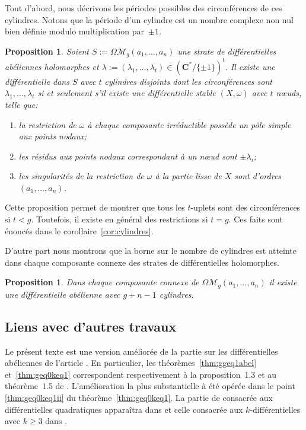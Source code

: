 \documentclass[11pt]{article}
\numberwithin{equation}{section}\renewcommand{\proofname}{Démonstration}
\let\mathcal\mathscr
\newcommand{\CC}{\mathbf{C}}
\newcommand{\omoduli}[1][g]{{\Omega\mathcal M}_{\!#1}}
\newtheorem{prop}[thm]{Proposition}
\theoremstyle{definition}
\begin{document}
Tout d'abord, nous décrivons les périodes possibles des circonférences de ces cylindres. Notons que la période d'un cylindre est un nombre complexe non nul bien définie modulo multiplication par~$\pm 1$.
\begin{prop}\label{prop:cylindres}
Soient $S:=\omoduli(a_{1},\dots,a_{n})$ une strate de différentielles abéliennes holomorphes et $\lambda:=(\lambda_{1},\dots,\lambda_{t})\in (\CC^{\ast}/\{\pm1\})^{t}$.
Il existe une différentielle dans $S$ avec $t$ cylindres disjoints dont les circonférences sont $\lambda_{1},\dots,\lambda_{t}$ si et seulement s'il existe une
différentielle stable $(X,\omega)$ avec $t$ nœuds, telle que:
\begin{enumerate}
\item la restriction de $\omega$ à chaque composante irréductible possède un pôle simple aux points nodaux;
\item les résidus aux points nodaux correspondant à un nœud sont $\pm \lambda_{i}$;
\item les singularités de la restriction de $\omega$ à la partie lisse de $X$ sont d'ordres $(a_{1},\dots,a_{n})$.
\end{enumerate}
\end{prop}
Cette proposition permet de montrer que tous les $t$-uplets sont des circonférences si $t<g$. Toutefois, il existe en général des restrictions si $t=g$. Ces faits sont énoncés dans le corollaire~\ref{cor:cylindres}.

D'autre part nous montrons que la borne sur le nombre de cylindres est atteinte dans chaque composante connexe des strates de différentielles holomorphes.
\begin{prop}\label{prop:cylcc}
Dans chaque composante connexe de $\omoduli(a_{1},\dots,a_{n})$ il existe une différentielle abélienne avec $g+n-1$ cylindres.
\end{prop}

\subsection{Liens avec d'autres travaux}
\label{sec:travauxintro}

Le présent texte est une version améliorée de la partie sur les différentielles abéliennes de l'article \cite{geta}. En particulier, les théorèmes~\ref{thm:ggeq1abel} et~\ref{thm:geq0keq1} correspondent respectivement à la proposition~1.3 et au théorème~1.5 de \cite{geta}. L'amélioration la plus substantielle à été opérée dans le point \eqref{thm:geq0keq1ii} du théorème~\ref{thm:geq0keq1}. La partie de \cite{geta} consacrée aux différentielles quadratiques apparaîtra dans \cite{getaquad} et celle consacrée aux $k$-différentielles avec $k\geq 3$ dans \cite{getakdiff}.
\end{document}
